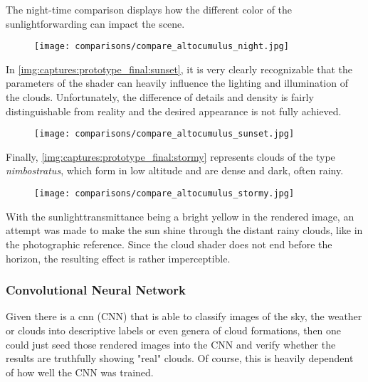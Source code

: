 \noindent
The night-time comparison displays how the different color of the \gls{sunlightforwarding} can impact the scene.

\begin{figure}[H]
    \centering
    \texttt{[image: comparisons/compare\_altocumulus\_night.jpg]}
    \label{img:comparisons:altocumulus:night}
\end{figure}

\clearpage
\noindent
In \autoref{img:captures:prototype_final:sunset}, it is very clearly recognizable that the \gls{parameters} of the shader can heavily influence the lighting and illumination of the clouds.
Unfortunately, the difference of details and density is fairly distinguishable from reality and the desired appearance is not fully achieved.

\begin{figure}[H]
    \centering
    \texttt{[image: comparisons/compare\_altocumulus\_sunset.jpg]}
    \label{img:camparisons:altocumulus:sunset}
\end{figure}

\noindent
Finally, \autoref{img:captures:prototype_final:stormy} represents clouds of the type \textit{nimbostratus}, which form in low altitude and are dense and dark, often rainy.


\begin{figure}[H]
    \centering
    \texttt{[image: comparisons/compare\_altocumulus\_stormy.jpg]}
    \label{img:camparisons:altocumulus:stormy}
\end{figure}

\noindent
With the \gls{sunlighttransmittance} being a bright yellow in the rendered image, an attempt was made to make the sun shine through the distant rainy clouds, like in the photographic reference. Since the cloud shader does not end before the horizon, the resulting effect is rather imperceptible.

\clearpage
\subsubsection{Convolutional Neural Network}
Given there is a \gls{cnn} (CNN) that is able to classify images of the sky, the weather or clouds into descriptive labels or even genera of cloud formations, then one could just seed those rendered images into the CNN and verify whether the results are truthfully showing "real" clouds.
Of course, this is heavily dependent of how well the CNN was trained.

